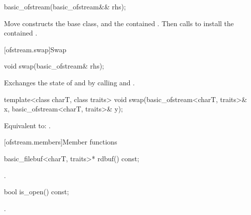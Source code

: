 %
\begin{itemdecl}
basic_ofstream(basic_ofstream&& rhs);
\end{itemdecl}

\begin{itemdescr}
\pnum
\effects
Move constructs the base class, and the contained .
Then calls 
to install the contained .
\end{itemdescr}

[ofstream.swap]{Swap}

%
\begin{itemdecl}
void swap(basic_ofstream& rhs);
\end{itemdecl}

\begin{itemdescr}
\pnum
\effects
Exchanges the state of 
and  by calling
 and
.
\end{itemdescr}

%
\begin{itemdecl}
template<class charT, class traits>
  void swap(basic_ofstream<charT, traits>& x, basic_ofstream<charT, traits>& y);
\end{itemdecl}

\begin{itemdescr}
\pnum
\effects
Equivalent to: .
\end{itemdescr}

[ofstream.members]{Member functions}

%
\begin{itemdecl}
basic_filebuf<charT, traits>* rdbuf() const;
\end{itemdecl}

\begin{itemdescr}
\pnum
\returns
{}.
\end{itemdescr}

%
\begin{itemdecl}
bool is_open() const;
\end{itemdecl}

\begin{itemdescr}
\pnum
\returns
{}.
\end{itemdescr}

